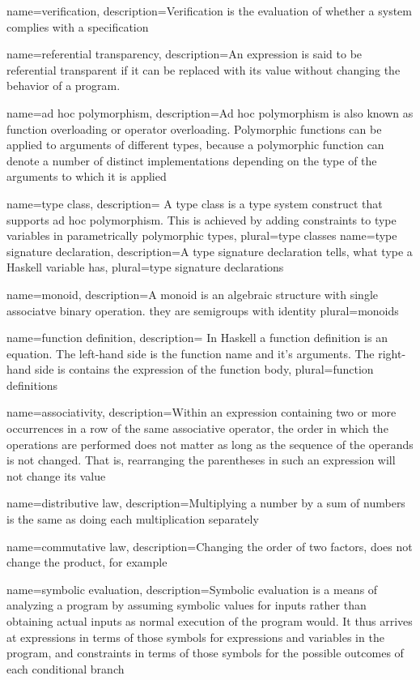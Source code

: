 {
name=verification,
description={Verification is the evaluation of whether a system complies with a specification}
}

{
name={referential transparency},
description={An expression is said to be referential transparent if it can be replaced with its value without changing the behavior of a program.}
}

{
name={ad hoc polymorphism},
description={Ad hoc polymorphism is also known as function overloading or operator overloading. Polymorphic functions can be applied to arguments of different types, because a polymorphic function can denote a number of distinct implementations depending on the type of the arguments to which it is applied}
}

{
name={type class},
description={ A type class is a type system construct that supports ad hoc polymorphism. This is achieved by adding constraints to type variables in parametrically polymorphic types},
plural={type classes}
}
{
name={type signature declaration},
description={A type signature declaration tells, what type a Haskell variable has},
plural={type signature declarations}
}

{
name={monoid},
description={A monoid is an algebraic structure with single associatve binary operation. they are semigroups with identity}
plural={monoids}
}

{
name={function definition},
description={ In Haskell a function definition is an equation. The left-hand side is the function name and it's arguments. The right-hand side is contains the expression of the function body},
plural={function definitions}
}

{
name={associativity},
description={Within an expression containing two or more occurrences in a row of the same associative operator, the order in which the operations are performed does not matter as long as the sequence of the operands is not changed. That is, rearranging the parentheses in such an expression will not change its value}
}

{
name={distributive law},
description={Multiplying a number by a sum of numbers is the same as doing each multiplication separately}
}

{
name={commutative law},
description={Changing the order of two factors, does not change the product, for example}
}

{
name={symbolic evaluation},
description={Symbolic evaluation is a means of analyzing a program by assuming symbolic values for inputs rather than obtaining actual inputs as normal execution of the program would. It thus arrives at expressions in terms of those symbols for expressions and variables in the program, and constraints in terms of those symbols for the possible outcomes of each conditional branch}
}

